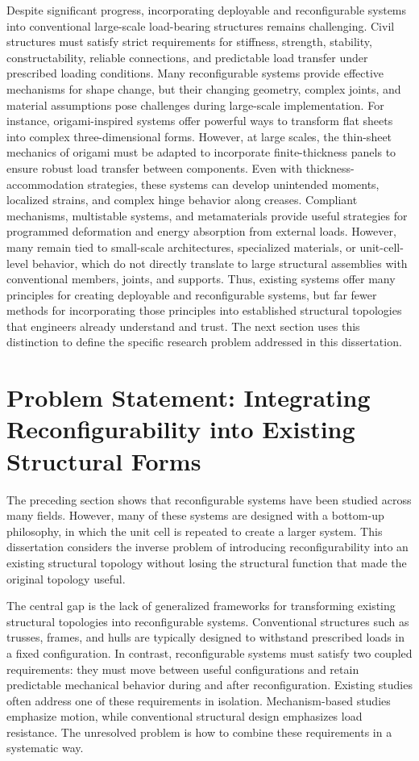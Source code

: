 Despite significant progress, incorporating deployable and reconfigurable systems into conventional large-scale load-bearing structures remains challenging. Civil structures must satisfy strict requirements for stiffness, strength, stability, constructability, reliable connections, and predictable load transfer under prescribed loading conditions. Many reconfigurable systems provide effective mechanisms for shape change, but their changing geometry, complex joints, and material assumptions pose challenges during large-scale implementation. For instance, origami-inspired systems offer powerful ways to transform flat sheets into complex three-dimensional forms. However, at large scales, the thin-sheet mechanics of origami must be adapted to incorporate finite-thickness panels to ensure robust load transfer between components. Even with thickness-accommodation strategies, these systems can develop unintended moments, localized strains, and complex hinge behavior along creases. Compliant mechanisms, multistable systems, and metamaterials provide useful strategies for programmed deformation and energy absorption from external loads. However, many remain tied to small-scale architectures, specialized materials, or unit-cell-level behavior, which do not directly translate to large structural assemblies with conventional members, joints, and supports. Thus, existing systems offer many principles for creating deployable and reconfigurable systems, but far fewer methods for incorporating those principles into established structural topologies that engineers already understand and trust. The next section uses this distinction to define the specific research problem addressed in this dissertation.

\section{Problem Statement: Integrating Reconfigurability into Existing Structural Forms}\label{01-sec-problem-statement}
The preceding section shows that reconfigurable systems have been studied across many fields. However, many of these systems are designed with a bottom-up philosophy, in which the unit cell is repeated to create a larger system. This dissertation considers the inverse problem of introducing reconfigurability into an existing structural topology without losing the structural function that made the original topology useful.

The central gap is the lack of generalized frameworks for transforming existing structural topologies into reconfigurable systems. Conventional structures such as trusses, frames, and hulls are typically designed to withstand prescribed loads in a fixed configuration. In contrast, reconfigurable systems must satisfy two coupled requirements: they must move between useful configurations and retain predictable mechanical behavior during and after reconfiguration. Existing studies often address one of these requirements in isolation. Mechanism-based studies emphasize motion, while conventional structural design emphasizes load resistance. The unresolved problem is how to combine these requirements in a systematic way.

